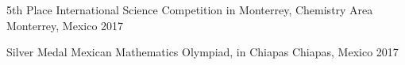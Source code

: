 
\begin{cvhonors}

  \cvhonor
    {5th Place} %
    {International Science Competition in Monterrey, Chemistry Area} %
    {Monterrey, Mexico} %
    {2017} %

  \cvhonor
    {Silver Medal} %
    {Mexican Mathematics Olympiad, in Chiapas} %
    {Chiapas, Mexico} %
    {2017} %

\end{cvhonors}
